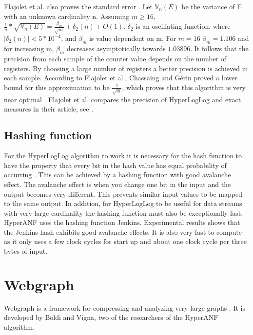 Flajolet et al. also proves the standard error \cite{hyperloglog}. Let $\mathbb{V}_n(E)$ be the variance of E with an unknown cardinality n. Assuming $m \geq 16$,  $\frac{1}{n}*\sqrt{\mathbb{V}_n(E)} = \frac{\beta_m}{\sqrt{m}}  + \delta_2(n) + O(1)$. $\delta_2$ is an oscillating function, where $|\delta_2(n)| < 5*10^{-4}$, and $\beta_m$ is value dependent on m. For $m = 16$ $\beta_m = 1.106$ and for increasing m, $\beta_m$ decreases asymptotically towards $1.03896$. It follows that the precision from each sample of the counter value depends on the number of registers. By choosing a large number of registers a better precision is achieved in each sample. According to Flajolet et al., Chassaing and Gérin proved a lower bound for this approximation to be $\frac{1}{\sqrt{m}}$, which proves that this algorithm is very near optimal \cite{nearopt}. Flajolet et al. compares the precision of HyperLogLog and exact measures in their article, see \cite{hyperloglog}.

\subsection{Hashing function}
For the HyperLogLog algorithm to work it is necessary for the hash function to have the property that every bit in the hash value has equal probability of occurring \cite{hyperloglog}. This can be achieved by a hashing function with good avalanche effect. The avalanche effect is when you change one bit in the input and the output becomes very different. This prevents similar input values to be mapped to the same output. In addition, for HyperLogLog to be useful for data streams with very large cardinality the hashing function must also be exceptionally fast. HyperANF uses the hashing function Jenkins. Experimental results shows that the Jenkins hash exhibits good avalanche effects. It is also very fast to compute as it only uses a few clock cycles for start up and about one clock cycle per three bytes of input.

\iffalse
\subsection{BroadWord}
Broadword is a way to do several calculations at the same time using cleverly constructed binary-logic expressions. HyperANF uses broadword to take the union $U$ of two HyperLogLog counters $A$ and $B$, which effectively is taking $\forall i; U_i = max(A_i,B_i)$
\fi

\section{Webgraph}
Webgraph is a framework for compressing and analyzing very large graphs \cite{webgraph-compression}. It is developed by Boldi and Vigna, two of the researchers of the HyperANF algorithm.


